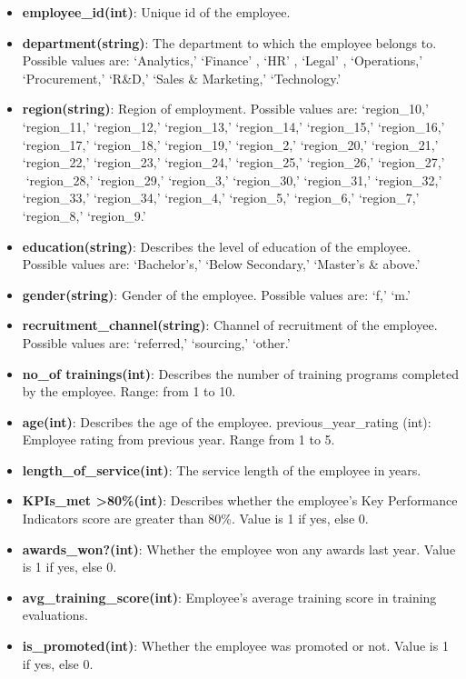 \documentclass[
]{article}
\providecommand{\tightlist}{%
  \setlength{\itemsep}{0pt}\setlength{\parskip}{0pt}}
\begin{document}
\begin{itemize}
\tightlist
\item
  \textbf{employee\_id(int)}: Unique id of the employee.
\item
  \textbf{department(string)}: The department to which the employee
  belongs to. Possible values are: `Analytics,' `Finance' , `HR' ,
  `Legal' , `Operations,' `Procurement,' `R\&D,' `Sales \& Marketing,'
  `Technology.'
\item
  \textbf{region(string)}: Region of employment. Possible values are:
  `region\_10,' `region\_11,' `region\_12,' `region\_13,' `region\_14,'
  `region\_15,' `region\_16,' `region\_17,' `region\_18,' `region\_19,'
  `region\_2,' `region\_20,' `region\_21,' `region\_22,' `region\_23,'
  `region\_24,' `region\_25,' `region\_26,' `region\_27,' `region\_28,'
  `region\_29,' `region\_3,' `region\_30,' `region\_31,' `region\_32,'
  `region\_33,' `region\_34,' `region\_4,' `region\_5,' `region\_6,'
  `region\_7,' `region\_8,' `region\_9.'
\item
  \textbf{education(string)}: Describes the level of education of the
  employee. Possible values are: `Bachelor's,' `Below Secondary,'
  `Master's \& above.'
\item
  \textbf{gender(string)}: Gender of the employee. Possible values are:
  `f,' `m.'
\item
  \textbf{recruitment\_channel(string)}: Channel of recruitment of the
  employee. Possible values are: `referred,' `sourcing,' `other.'
\item
  \textbf{no\_of trainings(int)}: Describes the number of training
  programs completed by the employee. Range: from 1 to 10.
\item
  \textbf{age(int)}: Describes the age of the employee.
  previous\_year\_rating (int): Employee rating from previous year.
  Range from 1 to 5.
\item
  \textbf{length\_of\_service(int)}: The service length of the employee
  in years.
\item
  \textbf{KPIs\_met \textgreater80\%(int)}: Describes whether the
  employee's Key Performance Indicators score are greater than 80\%.
  Value is 1 if yes, else 0.
\item
  \textbf{awards\_won?(int)}: Whether the employee won any awards last
  year. Value is 1 if yes, else 0.
\item
  \textbf{avg\_training\_score(int)}: Employee's average training score
  in training evaluations.
\item
  \textbf{is\_promoted(int)}: Whether the employee was promoted or not.
  Value is 1 if yes, else 0.
\end{itemize}
\end{document}
